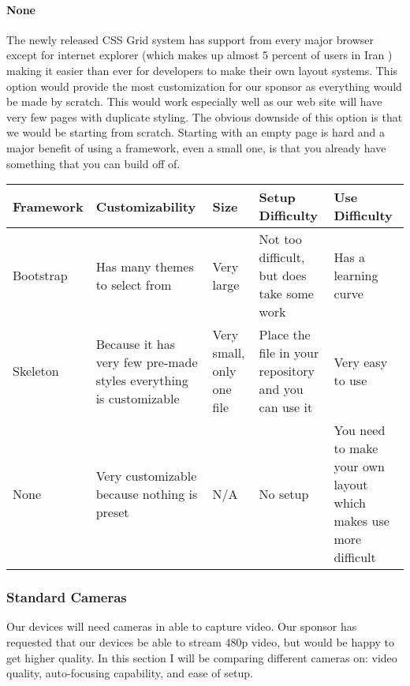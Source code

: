 \documentclass[onecolumn, draftclsnofoot,10pt, compsoc]{IEEEtran}
\begin{document}
            \paragraph{None}
            The newly released CSS Grid system has support from every major browser except for internet explorer (which makes up almost 5 percent of users in Iran \cite{IEEEhowto:CanIUseGrid}) making it easier than ever for developers to make their own layout systems. This option would provide the most customization for our sponsor as everything would be made by scratch. This would work especially well as our web site will have very few pages with duplicate styling. The obvious downside of this option is that we would be starting from scratch. Starting with an empty page is hard and a major benefit of using a framework, even a small one, is that you already have something that you can build off of.
            \newline
            \newline
            \begin{tabular}{|l|p{4cm}|p{2cm}|p{4cm}|p{4cm}|}
                 \hline
                 Framework & Customizability & Size & Setup Difficulty & Use Difficulty \\ \hline
                 
                 Bootstrap & Has many themes to select from & Very large & Not too difficult, but does take some work & Has a learning curve \\ \hline
                 
                 Skeleton & Because it has very few pre-made styles everything is customizable & Very small, only one file & Place the file in your repository and you can use it & Very easy to use \\ \hline
                 
                 None & Very customizable because nothing is preset & N/A & No setup & You need to make your own layout which makes use more difficult\\ \hline
            \end{tabular}
        
        \subsubsection{Standard Cameras}
        Our devices will need cameras in able to capture video. Our sponsor has requested that our devices be able to stream 480p video, but would be happy to get higher quality. In this section I will be comparing different cameras on: video quality, auto-focusing capability, and ease of setup.
        
\end{document}
